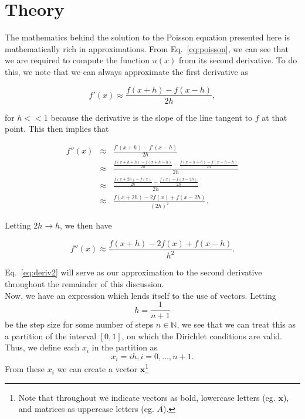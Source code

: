 \documentclass[12pt]{article}
\numberwithin{equation}{section}
\begin{document}
\section{Theory}
\label{sec:theory}
The mathematics behind the solution to the Poisson equation presented here is mathematically rich in approximations.  From Eq.~\ref{eq:poisson}, we can see that we are required to compute the function $u\left(x\right)$ from its second derivative.  To do this, we note that we can always approximate the first derivative as

\begin{equation}
\label{eq:deriv1}
f'\left(x\right) \approx \frac{f\left(x+h\right)-f\left(x-h\right)}{2h},
\end{equation}

\noindent for $h<<1$ because the derivative is the slope of the line tangent to $f$ at that point.  This then implies that

$$\begin{array}{ccc} f''\left(x\right)&\approx&\frac{f'\left(x+h\right)-f'\left(x-h\right)}{2h} \\
&\approx&\frac{\frac{f\left(x+h+h\right)-f\left(x+h-h\right)}{2h} - \frac{f\left(x-h+h\right)-f\left(x-h-h\right)}{2h}}{2h} \\
&\approx&\frac{\frac{f\left(x+2h\right)-f\left(x\right)}{2h} - \frac{f\left(x\right)-f\left(x-2h\right)}{2h}}{2h} \\
&\approx&\frac{f\left(x+2h\right)-2f\left(x\right)+f\left(x-2h\right)}{\left(2h\right)^{2}}.\end{array}$$

\noindent Letting $2h\rightarrow h$, we then have

\begin{equation}
\label{eq:deriv2}
f''\left(x\right)\approx\frac{f\left(x+h\right)-2f\left(x\right)+f\left(x-h\right)}{h^{2}}.
\end{equation}

\noindent Eq.~\ref{eq:deriv2} will serve as our approximation to the second derivative throughout the remainder of this discussion.  
\\\indent Now, we have an expression which lends itself to the use of vectors.  Letting $$h = \frac{1}{n+1}$$ be the step size for some number of steps $n\in\mathbb{N}$, we see that we can treat this as a partition of the interval $\left[0,1\right]$, on which the Dirichlet conditions are valid.  Thus, we define each $x_{i}$ in the partition as $$x_{i}=ih,i=0,\ldots,n+1.$$  From these $x_{i}$ we can create a vector $\textbf{x}$\footnote{Note that throughout we indicate vectors as bold, lowercase letters (eg. $\textbf{x}$), and matrices as uppercase letters (eg. $A$).}
\end{document}
